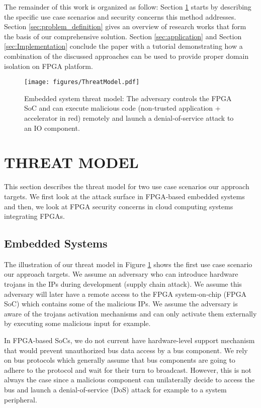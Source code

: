 \documentclass[sigconf]{acmart}
\theoremstyle{plain}
\theoremstyle{remark}
\begin{document}
The remainder of this work is organized as follow: Section \ref{sec:threat_model} starts by describing the specific use case scenarios and security concerns this method addresses. Section \ref{sec:problem_definition} gives an overview of research works that form the basis of our comprehensive solution. Section \ref{sec:application} and Section \ref{sec:Implementation} conclude the paper with a tutorial demonstrating how a combination of the discussed approaches can be used to provide proper domain isolation on FPGA platform.

\begin{figure}[h]
\centering
\texttt{[image: figures/ThreatModel.pdf]}
\caption{Embedded system threat model: The adversary controls the FPGA SoC and can execute malicious code (non-trusted application + accelerator in red) remotely and launch a denial-of-service attack to an IO component.}
\label{fig:threat}
\end{figure}

\section{THREAT MODEL} \label{sec:threat_model}

This section describes the threat model for two use case scenarios our approach targets. We first look at the attack surface in FPGA-based embedded systems and then, we look at FPGA security concerns in cloud computing systems integrating FPGAs.

\subsection{Embedded Systems}

The illustration of our threat model in Figure \ref{fig:threat} shows the first use case scenario our approach targets. We assume an adversary who can introduce hardware trojans in the IPs during development (supply chain attack). We assume this adversary will later have a remote access to the FPGA system-on-chip (FPGA SoC) which contains some of the malicious IPs. We assume the adversary is aware of the trojans activation mechanisms and can only activate them externally by executing some malicious input for example.

In FPGA-based SoCs, we do not current have hardware-level support mechanism that would prevent unauthorized bus data access by a bus component. We rely on bus protocols which generally assume that bus components are going to adhere to the protocol and wait for their turn to broadcast. However, this is not always the case since a malicious component can unilaterally decide to access the bus and launch a denial-of-service (DoS) attack for example to a system peripheral.
\end{document}
